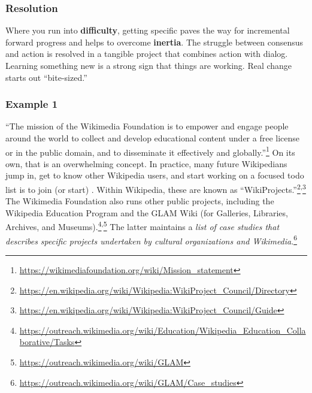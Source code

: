 \subsubsection*{Resolution}
Where you run into \textbf{difficulty}, getting specific paves the way for incremental forward progress and helps to overcome \textbf{inertia}.  The struggle between consensus and action is resolved in a tangible project that combines action with dialog.  Learning something new is a strong sign that things are working.
%
Real change starts out ``bite-sized.'' 

\subsubsection*{Example 1}
``The mission of the Wikimedia Foundation is to empower and engage people around the world to collect and develop educational content under a free license or in the public domain, and to disseminate it effectively and globally.''\footnote{\url{https://wikimediafoundation.org/wiki/Mission_statement}} On its own, that is an overwhelming concept.  In practice, many future Wikipedians jump in, get to know other Wikipedia users, and start working on a focused todo list is to join (or start)
.  Within Wikipedia, these are known
as
``WikiProjects.''\footnote{\url{https://en.wikipedia.org/wiki/Wikipedia:WikiProject_Council/Directory}}\textsuperscript{,}\footnote{\url{https://en.wikipedia.org/wiki/Wikipedia:WikiProject_Council/Guide}}
The Wikimedia Foundation also runs other public projects, including the Wikipedia Education Program and the GLAM Wiki (for Galleries, Libraries, Archives, and Museums).\footnote{\url{https://outreach.wikimedia.org/wiki/Education/Wikipedia_Education_Collaborative/Tasks}}\textsuperscript{,}\footnote{\url{https://outreach.wikimedia.org/wiki/GLAM}}  The latter maintains a \emph{list of case studies that describes specific projects undertaken by cultural organizations and Wikimedia}.\footnote{\url{https://outreach.wikimedia.org/wiki/GLAM/Case_studies}}

